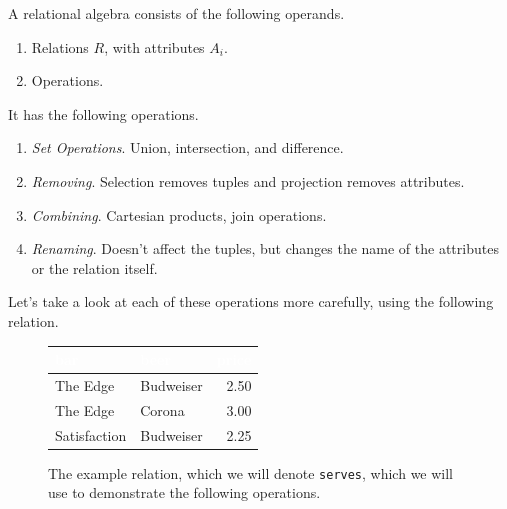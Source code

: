 \documentclass{article}
\begin{document}
    \begin{definition}
      A relational algebra consists of the following operands. 
      \begin{enumerate}
        \item Relations $R$, with attributes $A_i$. 
        \item Operations. 
      \end{enumerate}
      It has the following operations. 
      \begin{enumerate}
        \item \textit{Set Operations}. Union, intersection, and difference. 
        \item \textit{Removing}. Selection removes tuples and projection removes attributes. 
        \item \textit{Combining}. Cartesian products, join operations. 
        \item \textit{Renaming}. Doesn't affect the tuples, but changes the name of the attributes or the relation itself. 
      \end{enumerate}
    \end{definition}

    Let's take a look at each of these operations more carefully, using the following relation. 

    \begin{figure}[H]
      \centering
      \begin{tabular}{|l|l|r|}
      \hline
      \rowcolor[HTML]{E26B0A} 
      \textcolor{white}{\textbf{bar}} & \textcolor{white}{\textbf{beer}} & \textcolor{white}{\textbf{price}} \\ \hline
      \rowcolor[HTML]{FBCEB1}
      The Edge & Budweiser & 2.50 \\ \hline
      \rowcolor[HTML]{FBCEB1}
      The Edge & Corona & 3.00 \\ \hline
      \rowcolor[HTML]{FBCEB1}
      Satisfaction & Budweiser & 2.25 \\ \hline
      \end{tabular}
      \caption{The example relation, which we will denote \texttt{serves}, which we will use to demonstrate the following operations.} 
      \label{fig:serves}
    \end{figure}
    
\end{document}
